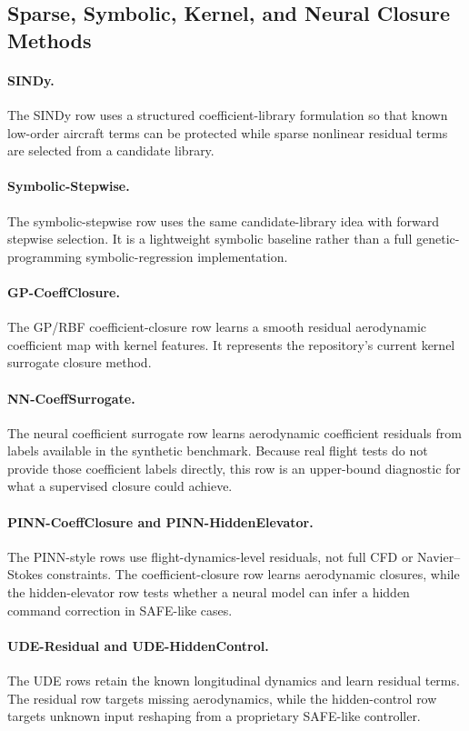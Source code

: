 \documentclass[11pt]{article}
\begin{document}
\subsection{Sparse, Symbolic, Kernel, and Neural Closure Methods}

\paragraph{SINDy.}
The SINDy row uses a structured coefficient-library formulation so that known low-order aircraft terms can be protected while sparse nonlinear residual terms are selected from a candidate library.

\paragraph{Symbolic-Stepwise.}
The symbolic-stepwise row uses the same candidate-library idea with forward stepwise selection. It is a lightweight symbolic baseline rather than a full genetic-programming symbolic-regression implementation.

\paragraph{GP-CoeffClosure.}
The GP/RBF coefficient-closure row learns a smooth residual aerodynamic coefficient map with kernel features. It represents the repository's current kernel surrogate closure method.

\paragraph{NN-CoeffSurrogate.}
The neural coefficient surrogate row learns aerodynamic coefficient residuals from labels available in the synthetic benchmark. Because real flight tests do not provide those coefficient labels directly, this row is an upper-bound diagnostic for what a supervised closure could achieve.

\paragraph{PINN-CoeffClosure and PINN-HiddenElevator.}
The PINN-style rows use flight-dynamics-level residuals, not full CFD or Navier--Stokes constraints. The coefficient-closure row learns aerodynamic closures, while the hidden-elevator row tests whether a neural model can infer a hidden command correction in SAFE-like cases.

\paragraph{UDE-Residual and UDE-HiddenControl.}
The UDE rows retain the known longitudinal dynamics and learn residual terms. The residual row targets missing aerodynamics, while the hidden-control row targets unknown input reshaping from a proprietary SAFE-like controller.
\end{document}
